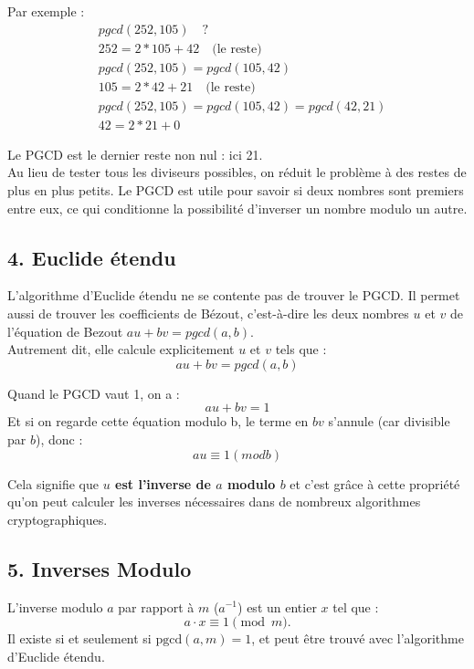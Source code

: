 Par exemple :
\begin{align*}
    &pgcd(252, 105) \quad ? \\
    &252 = 2 * 105 + 42 \quad \text{(le reste)} \\
    &pgcd(252,105) = pgcd(105,42) \\
    &105 = 2 * 42 + 21 \quad \text{(le reste)} \\
    &pgcd(252,105) = pgcd(105,42) = pgcd(42, 21) \\
    &42 = 2 * 21 + 0 
\end{align*}

Le PGCD est le dernier reste non nul : ici 21. \\

Au lieu de tester tous les diviseurs possibles, on réduit le problème à des restes de plus en plus petits. Le PGCD est utile pour savoir si deux nombres sont premiers entre eux, ce qui conditionne la possibilité d’inverser un nombre modulo un autre.

\subsection*{4. Euclide étendu}
L’algorithme d’Euclide étendu ne se contente pas de trouver le PGCD. Il permet aussi de trouver les coefficients de Bézout, c'est-à-dire les deux nombres $u$ et $v$ de l'équation de Bezout $au + bv = pgcd(a,b)$. \\

Autrement dit, elle calcule explicitement $u$ et $v$ tels que : 
\[
au + bv = pgcd(a,b)
\]

Quand le PGCD vaut 1, on a :
\[
au + bv = 1
\]
Et si on regarde cette équation modulo b, le terme en $bv$ s’annule (car divisible par $b$), donc :
\[
au \equiv 1(mod b)
\]

Cela signifie que \textbf{$u$ est l’inverse de $a$ modulo $b$} et c'est grâce à cette propriété qu’on peut calculer les inverses nécessaires dans de nombreux algorithmes cryptographiques.

\subsection*{5. Inverses Modulo}
L’inverse modulo \( a \) par rapport à \( m \) (\( a^{-1} \)) est un entier \( x \) tel que :
\[
a \cdot x \equiv 1 \pmod{m}.
\]
Il existe si et seulement si \( \text{pgcd}(a, m) = 1 \), et peut être trouvé avec l'algorithme d'Euclide étendu. \\


